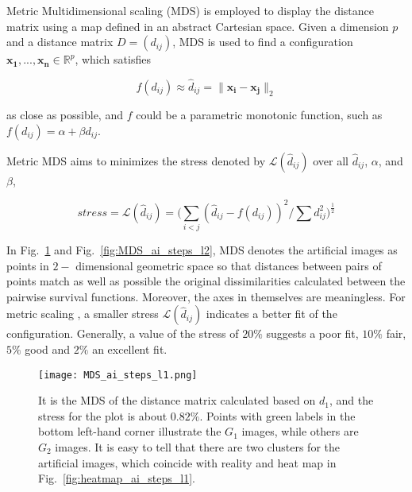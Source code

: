       
      Metric Multidimensional scaling (MDS) \cite{borg2005modern} is
      employed to display the distance matrix using a map defined in
      an abstract Cartesian space. Given a dimension $p$ and a
      distance matrix $D = (d_{ij})$, MDS is used to find a
      configuration $\bm{x_1}, ..., \bm{x_n} \in \mathbb{R}^p$, which
      satisfies

      \begin{equation}\label{eq:mMDS}
        f(d_{ij}) \approx \widehat{d}_{ij} = \lVert \bm{x_i} - \bm{x_j} \lVert_{2}
      \end{equation}

      as close as possible, and $f$ could be a parametric monotonic function, such as $f(d_{ij}) = \alpha + \beta d_{ij}$.

      Metric MDS aims to minimizes the stress denoted by $\mathcal{L}(\widehat{d}_{ij})$ over all $\widehat{d}_{ij}$, $\alpha$, and $\beta$,

      \begin{equation}\label{eq:stress_mMDS}
        stress = \mathcal{L}(\widehat{d}_{ij}) = \bigg( \sum_{i<j} (\widehat{d}_{ij} - f(d_{ij}))^2 / \sum d^2_{ij} \bigg)^{\frac{1}{2}}
      \end{equation}
      

      In Fig.~\ref{fig:MDS_ai_steps_l1} and
      Fig.~\ref{fig:MDS_ai_steps_l2}, MDS denotes the artificial
      images as points in $2-$ dimensional geometric space so that
      distances between pairs of points match as well as possible the
      original dissimilarities calculated between the pairwise
      survival functions. Moreover, the axes in themselves are
      meaningless. For metric scaling \cite{scikit-learn}, a smaller
      stress $\mathcal{L}(\widehat{d}_{ij})$ indicates a better fit of
      the configuration. Generally, a value of the stress of $20\%$
      suggests a poor fit, $10\%$ fair, $5\%$ good and $2\%$ an
      excellent fit.
       

      \begin{figure}
        \centering
        \texttt{[image: MDS\_ai\_steps\_l1.png]}
        \caption{It is the MDS of the distance matrix calculated based
          on $d_1$, and the stress for the plot is about $0.82\%$. Points
          with green labels in the bottom left-hand corner illustrate
          the $G_1$ images, while others are $G_2$ images. It is easy
          to tell that there are two clusters for the artificial
          images, which coincide with reality and heat map in
          Fig.~\ref{fig:heatmap_ai_steps_l1}.}
        \label{fig:MDS_ai_steps_l1}
      \end{figure}



